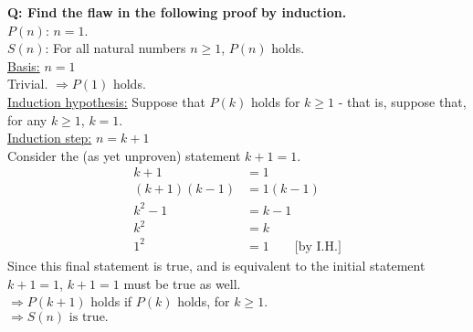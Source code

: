 \documentclass{article}
\begin{document}
{\bf Q: Find the flaw in the following proof by induction.}\\[1ex]
$P(n)$: $n=1$.\\[1ex]
$S(n)$: For all natural numbers $n\geq 1$, $P(n)$ holds.\\[1ex]
\underline{Basis:} $n=1$\\[1ex]
Trivial. $\Rightarrow P(1)$ holds.\\[1ex]
\underline{Induction hypothesis:} Suppose that $P(k)$ holds for $k\geq 1$ - that is, suppose that, for any $k\geq 1$, $k=1$.\\[1ex]
\underline{Induction step:} $n=k+1$\\[1ex]
Consider the (as yet unproven) statement $k+1=1$.
\begin{align*}
k+1& =1\\
(k+1)(k-1)& =1(k-1)\\
k^2-1& =k-1\\
k^2& =k\\
1^2& =1\qquad\text{[by I.H.]}
\end{align*}
Since this final statement is true, and is equivalent to the initial statement $k+1=1$, $k+1=1$ must be true as well.\\[1ex]
$\Rightarrow P(k+1)$ holds if $P(k)$ holds, for $k\geq 1$.\\[1ex]
$\boxed{\Rightarrow S(n)\text{ is true.}}$
\end{document}
